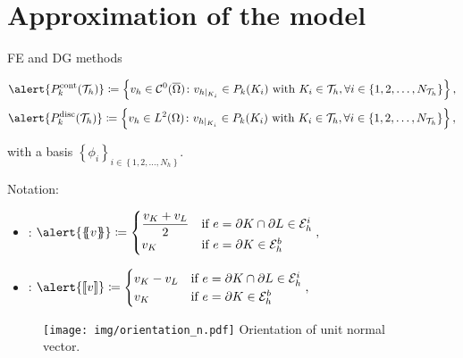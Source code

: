 \section{Approximation of the model}
\begin{frame}{FE and DG methods}
	\footnotesize
	\vspace*{-0.2cm}
	\begin{block}{}
		\begin{equation*}
			\alert{\Pc_k(\T_h)}\coloneqq\left\{v_h\in \mathcal{C}^0(\overline\Omega)\colon v_{h|_{K_i}}\in\mathbb{P}_k(K_i)\text{ with } K_i\in\T_h,\forall i\in\left\{1,2,\ldots,N_{\T_h}\right\}\right\},
		\end{equation*}
		\begin{equation*}
			\alert{\Pd_k(\T_h)}\coloneqq\left\{v_h\in L^2(\Omega)\colon v_{h|_{K_i}}\in\mathbb{P}_k(K_i)\text{ with } K_i\in\T_h,\forall i\in\left\{1,2,\ldots,N_{\T_h}\right\}\right\},
		\end{equation*}
	\end{block}
	with a basis $\left\{\phi_i\right\}_{i\in\left\{1,2,\ldots,N_h \right\}}$.
	
	\vspace*{0.3cm}
	Notation:
	
	\begin{minipage}{0.69\textwidth}
	\begin{itemize}
		\item {}: 
		$\alert{\media{v}}\coloneqq
		\begin{cases}
			\dfrac{\vK+\vL}{2}&\text{if } e=\partial K\cap\partial L\in\E_h^i\\
			\vK&\text{if }e=\partial K\in\E_h^b
		\end{cases},$
		\item {}: $
		\alert{\salto{v}}\coloneqq
		\begin{cases}
			\vK-\vL&\text{if } e=\partial K\cap\partial L\in\E_h^i\\
			\vK&\text{if }e=\partial K\in\E_h^b
		\end{cases},$
	\end{itemize}
	\end{minipage}
	\begin{minipage}{0.29\textwidth}
		\begin{figure}
			\centering
			\texttt{[image: img/orientation\_n.pdf]}
			{\scriptsize{} Orientation of unit normal vector.}
		\end{figure}
	\end{minipage}
\end{frame}


